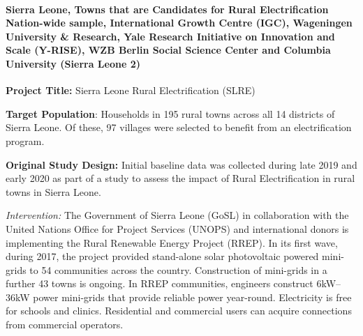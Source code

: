 \documentclass[
  12pt,
]{article}
\begin{document}
\hypertarget{sierra-leone-towns-that-are-candidates-for-rural-electrification-nation-wide-sample-international-growth-centre-igc-wageningen-university-research-yale-research-initiative-on-innovation-and-scale-y-rise-wzb-berlin-social-science-center-and-columbia-university-sierra-leone-2}{%
\paragraph*{Sierra Leone, Towns that are Candidates for Rural Electrification Nation-wide sample, International Growth Centre (IGC), Wageningen University \& Research, Yale Research Initiative on Innovation and Scale (Y-RISE), WZB Berlin Social Science Center and Columbia University (Sierra Leone 2)}\label{sierra-leone-towns-that-are-candidates-for-rural-electrification-nation-wide-sample-international-growth-centre-igc-wageningen-university-research-yale-research-initiative-on-innovation-and-scale-y-rise-wzb-berlin-social-science-center-and-columbia-university-sierra-leone-2}}

\textbf{Project Title:} Sierra Leone Rural Electrification (SLRE)

\textbf{Target Population}: Households in 195 rural towns across all 14 districts of Sierra Leone. Of these, 97 villages were selected to benefit from an electrification program.

\textbf{Original Study Design:} Initial baseline data was collected during late 2019 and early 2020 as part of a study to assess the impact of Rural Electrification in rural towns in Sierra Leone.

\emph{Intervention:} The Government of Sierra Leone (GoSL) in collaboration with the United Nations Office for Project Services (UNOPS) and international donors is implementing the Rural Renewable Energy Project (RREP). In its first wave, during 2017, the project provided stand-alone solar photovoltaic powered mini-grids to 54 communities across the country. Construction of mini-grids in a further 43 towns is ongoing. In RREP communities, engineers construct 6kW--36kW power mini-grids that provide reliable power year-round. Electricity is free for schools and clinics. Residential and commercial users can acquire connections from commercial operators.
\end{document}
